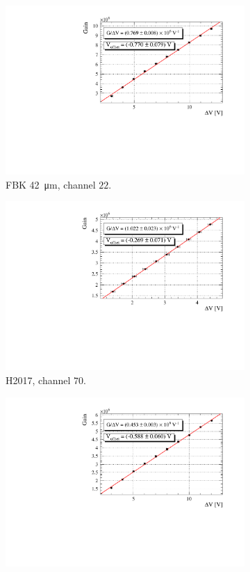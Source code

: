 \begin{figure}[htbp]
\begin{subfigure}{0.48\textwidth}
    \includegraphics[width=\textwidth]{gfx/plots/Gain/42/Gain.pdf}
    \caption{FBK \SI{42}{\micro m}, channel $22$.}
    \label{fig:42 gain }
  \end{subfigure}
  \hfill
  \begin{subfigure}{0.48\textwidth}
    \includegraphics[width=\textwidth]{gfx/plots/Gain/H2017/Gain.pdf}
    \caption{H2017, channel $70$.}
    \label{fig:H2017 gain }
  \end{subfigure}
  \hfill
  \begin{subfigure}{0.48\textwidth}
    \includegraphics[width=\textwidth]{gfx/plots/Gain/31epoxy/Gain.pdf}

\end{subfigure}
\end{figure}
